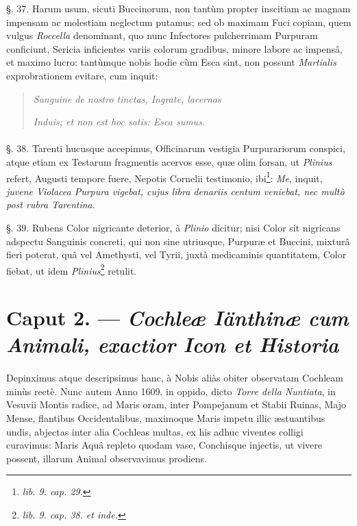 \documentclass[a4paper, 11pt, oneside, polutonikogreek, german]{article}
\begin{document}
§. 37. Harum usum, sicuti Buccinorum, non tantùm propter inscitiam ac magnam impensam ac molestiam neglectum putamus; sed ob maximam Fuci copiam, quem vulgus \emph{Roccella} denominant, quo nunc Infectores pulcherrimam Purpuram conficiunt, Sericia inficientes variis colorum gradibus, minore labore ac impensâ, et maximo lucro: tantùmque nobis hodie cùm Esca sint, non possunt \emph{Martialis} exprobrationem evitare, cum inquit:
\begin{quotation}
\emph{Sanguine de nostro tinctas, Ingrate, lacernas}

\emph{Induis; et non est hoc satis: Esca sumus.}
\end{quotation}
\paragraph{}
§. 38. Tarenti hucusque accepimus, Officinarum vestigia Purpurariorum conspici, atque etiam ex Testarum fragmentis acervos esse, quæ olim forsan, ut \emph{Plinius} refert, Augusti tempore fuere, Nepotis Cornelii testimonio, ibi\footnote{\emph{lib. 9. cap. 29.}}: \emph{Me}, inquit, \emph{juvene Violacea Purpura vigebat, cujus libra denariis centum veniebat, nec multò post rubra Tarentina}.

§. 39. Rubens Color nigricante deterior, à \emph{Plinio} dicitur; nisi Color sit nigricans adspectu Sanguinis concreti, qui non sine utriusque, Purpuræ et Buccini, mixturâ fieri poterat, quâ vel Amethysti, vel Tyrii, juxtà medicaminis quantitatem, Color fiebat, ut idem \emph{Plinius}\footnote{\emph{lib. 9. cap. 38. et inde.}} retulit.

\section{Caput 2. --- \emph{Cochleæ Iänthinæ cum Animali, exactior Icon et Historia}}
\paragraph{}
Depinximus atque descripsimus hanc, à Nobis aliàs obiter observatam Cochleam minùs rectè. Nunc autem Anno 1609. in oppido, dicto \emph{Torre della Nuntiata}, in Vesuvii Montis radice, ad Maris oram, inter Pompejanum et Stabii Ruinas, Majo Mense, flantibus Occidentalibus, maximoque Maris impetu illic æstuantibus undis, abjectas inter alia Cochleas multas, ex his adhuc viventes colligi curavimus: Maris Aquâ repleto quodam vase, Conchisque injectis, ut vivere possent, illarum Animal observavimus prodiens.
\end{document}
